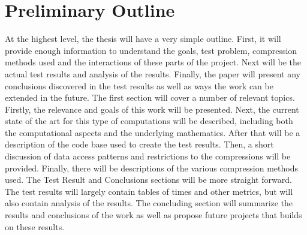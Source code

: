 \documentclass[titlepage]{article}
\begin{document}
\section{Preliminary Outline}

At the highest level, the thesis will have a very simple outline.
First, it will provide enough information to understand the goals, test problem, compression methods used and the interactions of these parts of the project.
Next will be the actual test results and analysis of the results.
Finally, the paper will present any conclusions discovered in the test results as well as ways the work can be extended in the future.
The first section will cover a number of relevant topics.
Firstly, the relevance and goals of this work will be presented.
Next, the current state of the art for this type of computations will be described,
including both the computational aspects and the underlying mathematics.
After that will be a description of the code base used to create the test results.
Then, a short discussion of data access patterns and restrictions to the compressions will be provided.
Finally, there will be descriptions of the various compression methods used.
The Test Result and Conclusions sections will be more straight forward.
The test results will largely contain tables of times and other metrics, but will also contain analysis of the results.
The concluding section will summarize the results and conclusions of the work as well as propose future projects that builds on these results.


\nocite{*}


\end{document}
